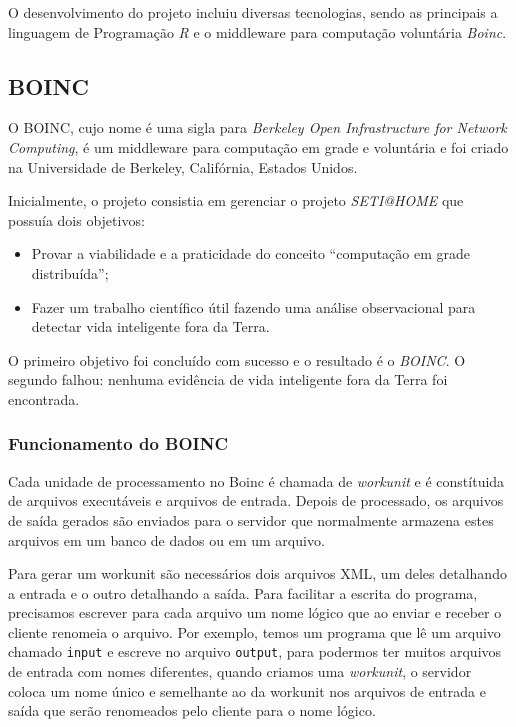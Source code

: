 
O desenvolvimento do projeto incluiu diversas tecnologias, sendo as principais a linguagem de Programação \emph{R} e o middleware
para computação voluntária \emph{Boinc}.

\subsection{BOINC}


O BOINC, cujo nome é uma sigla para \textit{Berkeley Open Infrastructure for Network Computing}, é um middleware 
para computação em grade e voluntária e foi criado na Universidade de Berkeley, Califórnia, Estados Unidos.

Inicialmente, o projeto consistia em gerenciar o projeto \textit{SETI@HOME} que possuía dois objetivos:

\begin{itemize}
	\item Provar a viabilidade e a praticidade do conceito ``computação em grade distribuída'';
	\item Fazer um trabalho científico útil fazendo uma análise observacional para detectar vida inteligente fora da Terra.
\end{itemize}

O primeiro objetivo foi concluído com sucesso e o resultado é o \textit{BOINC}. O segundo falhou: nenhuma evidência de 
vida inteligente fora da Terra foi encontrada. 

\subsubsection{Funcionamento do BOINC}

Cada unidade de processamento no Boinc é chamada de \emph{workunit} e é constítuida de arquivos executáveis e 
arquivos de entrada. Depois de processado, os arquivos de saída gerados são enviados para o servidor que
normalmente armazena estes arquivos em um banco de dados ou em um arquivo.

Para gerar um workunit são necessários dois arquivos XML, um deles detalhando a entrada e o 
outro detalhando a saída. Para facilitar a escrita do programa, precisamos escrever para cada arquivo um nome lógico 
que ao enviar e receber o cliente renomeia o arquivo. Por exemplo, temos um programa que lê um arquivo chamado 
\verb#input# e escreve no arquivo \verb#output#, para podermos ter muitos arquivos de entrada com nomes diferentes, quando
criamos uma \emph{workunit}, o servidor coloca um nome único e semelhante ao da workunit nos arquivos de entrada e saída que serão renomeados
pelo cliente para o nome lógico.

